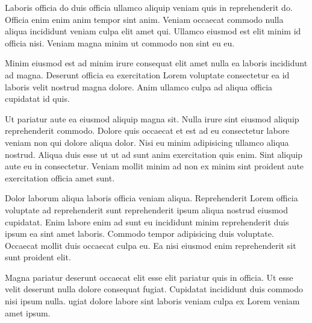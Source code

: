Laboris officia do duis officia ullamco aliquip veniam quis in reprehenderit do. 
Officia enim enim anim tempor sint anim. 
Veniam occaecat commodo nulla aliqua incididunt veniam culpa elit amet qui. 
Ullamco eiusmod est elit minim id officia nisi. Veniam magna minim ut commodo non sint eu eu.

Minim eiusmod est ad minim irure consequat elit amet nulla ea laboris incididunt ad magna.
Deserunt officia ea exercitation Lorem voluptate consectetur ea id laboris velit nostrud magna dolore. 
Anim ullamco culpa ad aliqua officia cupidatat id quis.

Ut pariatur aute ea eiusmod aliquip magna sit. 
Nulla irure sint eiusmod aliquip reprehenderit commodo. 
Dolore quis occaecat et est ad eu consectetur labore veniam non qui dolore aliqua dolor. 
Nisi eu minim adipisicing ullamco aliqua nostrud. 
Aliqua duis esse ut ut ad sunt anim exercitation quis enim. 
Sint aliquip aute eu in consectetur. 
Veniam mollit minim ad non ex minim sint proident aute exercitation officia amet sunt.

Dolor laborum aliqua laboris officia veniam aliqua. 
Reprehenderit Lorem officia voluptate ad reprehenderit sunt reprehenderit ipsum aliqua nostrud eiusmod cupidatat. 
Enim labore enim ad sunt eu incididunt minim reprehenderit duis ipsum ea sint amet laboris. 
Commodo tempor adipisicing duis voluptate. 
Occaecat mollit duis occaecat culpa eu. 
Ea nisi eiusmod enim reprehenderit sit sunt proident elit.

Magna pariatur deserunt occaecat elit esse elit pariatur quis in officia. 
Ut esse velit deserunt nulla dolore consequat fugiat. 
Cupidatat incididunt duis commodo nisi ipsum nulla. 
ugiat dolore labore sint laboris veniam culpa ex Lorem veniam amet ipsum.
